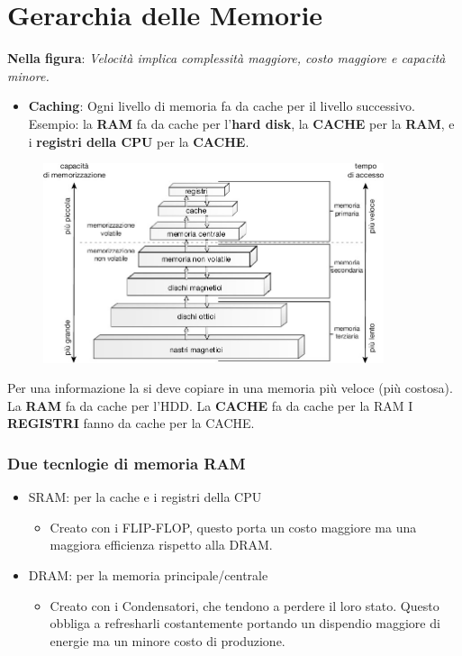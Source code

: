 \section{Gerarchia delle Memorie}
\textbf{Nella figura}: \textit{Velocità implica complessità maggiore, costo maggiore e capacità minore.}
\begin{itemize}
    \item \textbf{Caching}: Ogni livello di memoria fa da cache per il livello successivo. Esempio: la \textbf{RAM} fa da cache per l'\textbf{hard disk}, la \textbf{CACHE} per la \textbf{RAM}, e i \textbf{registri della CPU} per la \textbf{CACHE}.
\end{itemize}

\begin{figure}[ht!]
    \centering
    \includegraphics[width=10cm]{images/gerarchia delle memorie.png}
    \label{fig:gerarchy-of-memory}
\end{figure}

Per una informazione  la si deve copiare in una memoria più veloce (più costosa).
La \textbf{RAM} fa da cache per l'HDD.
La \textbf{CACHE} fa da cache per la RAM
I \textbf{REGISTRI} fanno da cache per la CACHE.

\subsubsection{Due tecnlogie di memoria RAM}
\begin{itemize}
    \item SRAM: per la cache e i registri della CPU
    \begin{itemize}
        \item Creato con i FLIP-FLOP, questo porta un costo maggiore ma una maggiora efficienza rispetto alla DRAM.
    \end{itemize}
    \item DRAM: per la memoria principale/centrale
    \begin{itemize}
        \item Creato con i Condensatori, che tendono a perdere il loro stato. Questo obbliga a refresharli costantemente portando un dispendio maggiore di energie ma un minore costo di produzione.
    \end{itemize}
\end{itemize}

